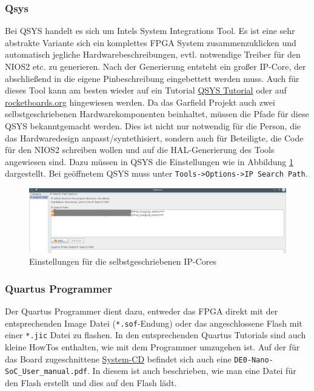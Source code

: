 \subsubsection{Qsys}
Bei QSYS handelt es sich um Intels System Integrations Tool. Es ist eine sehr abstrakte Variante sich ein komplettes \ac{FPGA} System zusammenzuklicken und automatisch jegliche Hardwarebeschreibungen, evtl. notwendige Treiber für den NIOS2 etc. zu generieren. Nach der Generierung entsteht ein großer IP-Core, der abschließend in die eigene Pinbeschreibung eingebettett werden muss. Auch für dieses Tool kann am besten wieder auf ein Tutorial \href{https://www.altera.com/content/dam/altera-www/global/en_US/pdfs/literature/tt/tt_qsys_intro.pdf}{QSYS Tutorial} oder auf \href{rocketboards.org}{rocketboards.org} hingewiesen werden.
Da das Garfield Projekt auch zwei selbstgeschriebenen Hardwarekomponenten beinhaltet, müssen die Pfade für diese QSYS bekanntgemacht werden. Dies ist nicht nur notwendig für die Person, die das Hardwaredesign anpasst/syntethisiert, sondern auch für Beteiligte, die Code für den NIOS2 schreiben wollen und auf die \ac{HAL}-Generierung des Tools angewiesen sind. Dazu müssen in QSYS die Einstellungen wie in Abbildung \ref{Settings:IP} dargestellt. Bei geöffnetem QSYS muss unter \texttt{Tools->Options->IP Search Path}.

\begin{figure}
	\includegraphics[width=\textwidth]{Abb/Qsys_settings.png}
	\caption{Einstellungen für die selbstgeschriebenen \ac{IP}-Cores}
	\label{Settings:IP}
\end{figure}

\subsubsection{Quartus Programmer}
Der Quartus Programmer dient dazu, entweder das \ac{FPGA} direkt mit der entsprechenden Image Datei (\texttt{*.sof}-Endung) oder das angeschlossene Flash mit einer \texttt{*.jic} Datei zu flashen. In den entsprechenden Quartus Tutorials sind auch kleine HowTos enthalten, wie mit dem Programmer umzugehen ist. Auf der für das Board zugeschnittene \href{http://www.terasic.com/downloads/cd-rom/de0-nano-soc/}{System-CD} befindet sich auch eine \texttt{DE0-Nano-SoC\_User\_manual.pdf}. In diesem ist auch beschrieben, wie man eine Datei für den Flash erstellt und dies auf den Flash lädt.